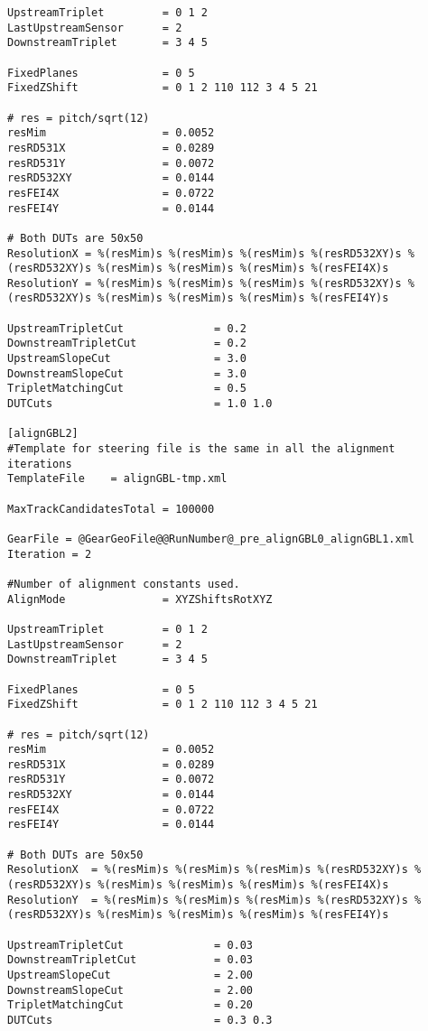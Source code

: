 \begin{lstlisting}[caption={Configuration file of EUTelescope for the testbeam anaylsis of June 2020 Batch 3}]
UpstreamTriplet         = 0 1 2
LastUpstreamSensor      = 2
DownstreamTriplet       = 3 4 5

FixedPlanes             = 0 5
FixedZShift             = 0 1 2 110 112 3 4 5 21

# res = pitch/sqrt(12)
resMim                  = 0.0052
resRD531X               = 0.0289
resRD531Y               = 0.0072
resRD532XY              = 0.0144
resFEI4X                = 0.0722
resFEI4Y                = 0.0144

# Both DUTs are 50x50
ResolutionX = %(resMim)s %(resMim)s %(resMim)s %(resRD532XY)s %(resRD532XY)s %(resMim)s %(resMim)s %(resMim)s %(resFEI4X)s
ResolutionY = %(resMim)s %(resMim)s %(resMim)s %(resRD532XY)s %(resRD532XY)s %(resMim)s %(resMim)s %(resMim)s %(resFEI4Y)s

UpstreamTripletCut              = 0.2
DownstreamTripletCut            = 0.2
UpstreamSlopeCut                = 3.0
DownstreamSlopeCut              = 3.0
TripletMatchingCut              = 0.5
DUTCuts                         = 1.0 1.0

[alignGBL2]
#Template for steering file is the same in all the alignment iterations
TemplateFile    = alignGBL-tmp.xml

MaxTrackCandidatesTotal = 100000

GearFile = @GearGeoFile@@RunNumber@_pre_alignGBL0_alignGBL1.xml
Iteration = 2

#Number of alignment constants used.
AlignMode               = XYZShiftsRotXYZ

UpstreamTriplet         = 0 1 2
LastUpstreamSensor      = 2
DownstreamTriplet       = 3 4 5

FixedPlanes             = 0 5
FixedZShift             = 0 1 2 110 112 3 4 5 21

# res = pitch/sqrt(12)
resMim                  = 0.0052
resRD531X               = 0.0289
resRD531Y               = 0.0072
resRD532XY              = 0.0144
resFEI4X                = 0.0722
resFEI4Y                = 0.0144

# Both DUTs are 50x50
ResolutionX  = %(resMim)s %(resMim)s %(resMim)s %(resRD532XY)s %(resRD532XY)s %(resMim)s %(resMim)s %(resMim)s %(resFEI4X)s
ResolutionY  = %(resMim)s %(resMim)s %(resMim)s %(resRD532XY)s %(resRD532XY)s %(resMim)s %(resMim)s %(resMim)s %(resFEI4Y)s

UpstreamTripletCut              = 0.03
DownstreamTripletCut            = 0.03
UpstreamSlopeCut                = 2.00
DownstreamSlopeCut              = 2.00
TripletMatchingCut              = 0.20
DUTCuts                         = 0.3 0.3


\end{lstlisting}
